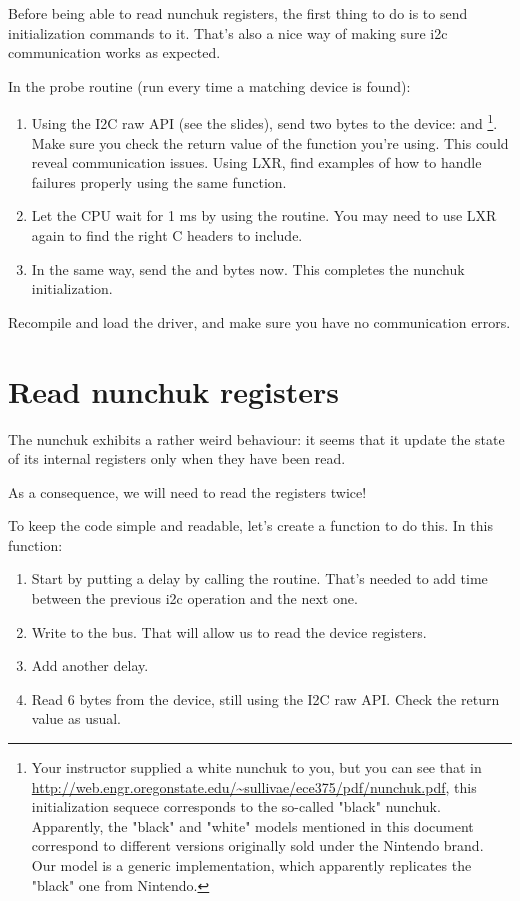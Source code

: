 Before being able to read nunchuk registers, the first thing to do is 
to send initialization commands to it. That's also a nice way of making
sure i2c communication works as expected.

In the probe routine (run every time a matching device is found):

\begin{enumerate}
\item Using the I2C raw API (see the slides), send two bytes to the
      device:  and 
      \footnote{Your instructor supplied a white nunchuk to you, but you
      can see that in
      \url{http://web.engr.oregonstate.edu/~sullivae/ece375/pdf/nunchuk.pdf},
      this initialization sequece corresponds to the so-called "black"
      nunchuk. Apparently, the "black" and "white" models mentioned in
      this document correspond to different versions originally sold
      under the Nintendo brand. Our model is a generic implementation,
      which apparently replicates the "black" one from Nintendo.}.
      Make sure you check the return value of 
      the function you're using. This could reveal communication issues.
      Using LXR, find examples of how to handle failures properly using
      the same function.
\item Let the CPU wait for 1 ms by using the  routine.
      You may need to use LXR again to find the right C headers to
      include.
\item In the same way, send the  and  bytes now. 
      This completes the nunchuk initialization.
\end{enumerate}

Recompile and load the driver, and make sure you have no communication
errors.

\section{Read nunchuk registers}

The nunchuk exhibits a rather weird behaviour: it seems that it update
the state of its internal registers only when they have been read.

As a consequence, we will need to read the registers twice!

To keep the code simple and readable, let's create a
 function to do this. In this function:

\begin{enumerate}
\item Start by putting a  delay by calling the
       routine. That's needed to add time between the
      previous i2c operation and the next one.
\item Write  to the bus. That will allow us to read
      the device registers.
\item Add another  delay.
\item Read 6 bytes from the device, still using the I2C raw API.
      Check the return value as usual. 
\end{enumerate}


